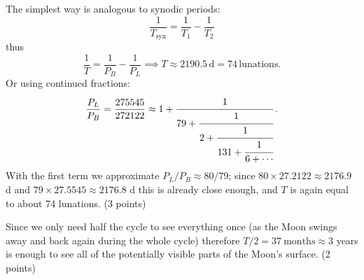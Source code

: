 \begin{description}
  The simplest way is analogous to synodic periods:
  \[
    \frac{1}{T_{\mathrm{syn}}} = \frac{1}{T_1} - \frac{1}{T_2}
  \]
  thus
  \[
    \frac{1}{T} = \frac{1}{P_B} - \frac{1}{P_L}
    \implies T \approx 2190.5\,\mathrm{d} = 74\,\mathrm{lunations}.
  \]
  Or using continued fractions:
  \[
    \frac{P_L}{P_B} = \frac{275545}{272122}
    \approx 1 + \cfrac{1}{79 + \cfrac{1}{2 + \cfrac{1}{131 + \cfrac{1}{6 + \cdots}}}}\,.
  \]
  With the first term we approximate $P_L/P_B \approx 80/79$; since
  $80 \times 27.2122 \approx 2176.9$ d and $79 \times 27.5545 \approx 2176.8$ d
  this is already close enough, and $T$ is again equal to about 74 lunations.
  \hfill(3 points)

  Since we only need half the cycle to see everything once (as the Moon swings
  away and back again during the whole cycle) therefore
  $T/2 = 37\ \mathrm{months} \approx 3$ years is enough to see all of the
  potentially visible parts of the Moon's surface.
  \hfill(2 points)
\end{description}
